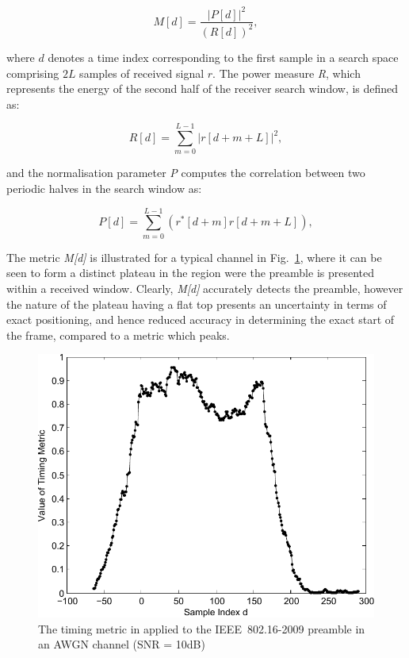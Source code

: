 \begin{center}
\begin{equation}
\label{MMetric}
M[d] = \frac{|P[d]|^2} {(R[d])^2},
\end{equation}
\end{center} 

where $d$ denotes a time index corresponding to the first sample in a search space comprising $2L$ samples of received signal $r$. The power measure \emph{R}, which represents the energy of the second half of the receiver search window, is defined as:

\begin{center}
\begin{equation}
\label{RMetric}
R[d] =\sum_{m =0}^{L-1}   |r[d+m+L]|^2,
\end{equation}
\end{center} 

and the normalisation parameter \emph{P} computes the correlation between two periodic halves in the search window as:

\begin{center}
\begin{equation}
\label{PMetric}
P[d] =\sum_{m =0}^{L-1}    (r^{*}[d+m] r[d+m+L] ),
\end{equation}
\end{center} 


The metric \emph{M[d]} is illustrated for a typical channel in Fig.~\ref{fig:M1-10dB}, where it can be seen to form a distinct plateau in the region were the preamble is presented within a received window. 
Clearly, \emph{M[d]} accurately detects the preamble, however the nature of the plateau having a flat top presents an uncertainty in terms of exact positioning, and hence reduced accuracy in determining the exact start of the frame, compared to a metric which peaks.

\begin{figure}
	\centerline{\includegraphics [width=0.8\columnwidth] {figures/M1_10dB.pdf} }
	\caption{The timing metric in \cite{Schmidl1997} applied to the IEEE~802.16-2009 preamble in an AWGN channel (SNR = 10dB)}
	\label{fig:M1-10dB}
\end{figure}

